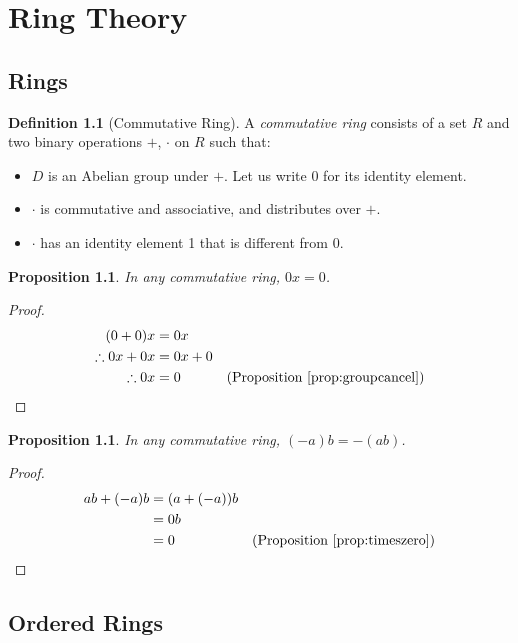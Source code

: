 \documentclass{book}
\let\qed\relax
\newtheorem{prop}[ax]{Proposition}
\theoremstyle{definition}
\newtheorem{df}[ax]{Definition}
\begin{document}
\chapter{Ring Theory}

\section{Rings}

\begin{df}[Commutative Ring]
A \emph{commutative ring} consists of a set $R$ and two binary operations $+$, $\cdot$ on $R$ such that:
\begin{itemize}
\item
$D$ is an Abelian group under $+$. Let us write 0 for its identity element.
\item
$\cdot$ is commutative and associative, and distributes over $+$.
\item
$\cdot$ has an identity element 1 that is different from 0.
\end{itemize}
\end{df}

\begin{prop}
\label{prop:timeszero}
In any commutative ring, $0x = 0$.
\end{prop}

\begin{proof}
\pf
\begin{align*}
(0+0)x & = 0x \\
\therefore 0x + 0x & = 0x + 0 \\
\therefore 0x & = 0 & (\text{Proposition \ref{prop:groupcancel}}) \qed
\end{align*}
\end{proof}

\begin{prop}
In any commutative ring, $(-a)b = -(ab)$.
\end{prop}

\begin{proof}
\pf
\begin{align*}
ab + (-a)b & = (a + (-a))b \\
& = 0b \\
& = 0 & (\text{Proposition \ref{prop:timeszero}}) \qed
\end{align*}
\end{proof}

\section{Ordered Rings}
\end{document}
